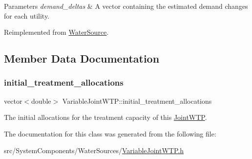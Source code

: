 \begin{DoxyParams}{Parameters}
{\em demand\+\_\+deltas} & A vector containing the estimated demand changes for each utility. \\
\hline
\end{DoxyParams}


Reimplemented from \mbox{\hyperlink{classWaterSource_afe2f6b96383abdb14563db279a261a31}{Water\+Source}}.



\subsection{Member Data Documentation}
\mbox{\label{classVariableJointWTP_a0115a36864d92e6e7db8fd6e24a14c0c}} 
\subsubsection{\texorpdfstring{initial\+\_\+treatment\+\_\+allocations}{initial\_treatment\_allocations}}
{\footnotesize\ttfamily vector$<$double$>$ Variable\+Joint\+W\+T\+P\+::initial\+\_\+treatment\+\_\+allocations\hspace{0.3cm}{\ttfamily [private]}}



The initial allocations for the treatment capacity of this \mbox{\hyperlink{classJointWTP}{Joint\+W\+TP}}. 



The documentation for this class was generated from the following file\+:\begin{DoxyCompactItemize}
\item 
src/\+System\+Components/\+Water\+Sources/\mbox{\hyperlink{VariableJointWTP_8h}{Variable\+Joint\+W\+T\+P.\+h}}\end{DoxyCompactItemize}

